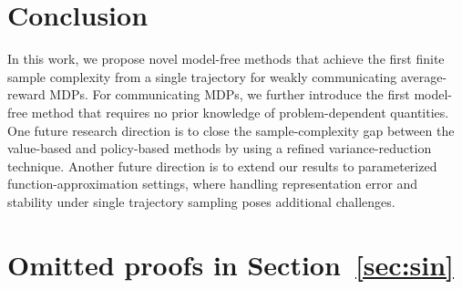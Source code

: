 \documentclass{article}
\theoremstyle{definition}
\theoremstyle{remark}
\newtheorem{fact}{Fact}
\begin{document}
\section{Conclusion}
In this work, we propose novel model-free methods that achieve the first finite sample complexity from a single trajectory for weakly communicating average-reward MDPs. For communicating MDPs, we further introduce the first model-free method that requires no prior knowledge of problem-dependent quantities. One future research direction is to close the sample-complexity gap between the value-based and policy-based methods by using a refined variance-reduction technique. Another  future direction is to extend our results to parameterized function-approximation settings, where handling representation error and stability under single trajectory sampling poses additional challenges.


\newpage



\newpage
\appendix





\section{Omitted proofs in Section~\ref{sec:sin}}
\end{document}
